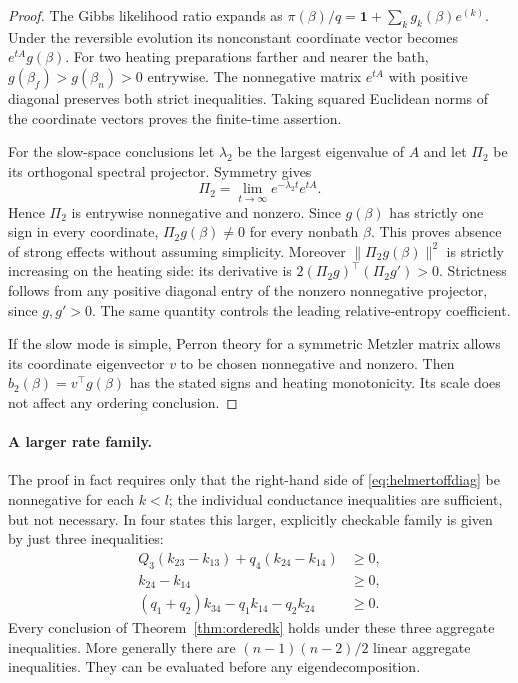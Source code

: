 \begin{proof}
The Gibbs likelihood ratio expands as
$\pi(\beta)/q=\mathbf1+\sum_k g_k(\beta)e^{(k)}$.
Under the reversible evolution its nonconstant coordinate vector becomes
$e^{tA}g(\beta)$. For two heating preparations farther and nearer the bath,
$g(\beta_f)>g(\beta_n)>0$ entrywise. The nonnegative matrix $e^{tA}$ with
positive diagonal preserves both strict inequalities. Taking squared
Euclidean norms of the coordinate vectors proves the finite-time assertion.

For the slow-space conclusions let $\lambda_2$ be the largest eigenvalue
of $A$ and let $\Pi_2$ be its orthogonal spectral projector. Symmetry gives
\[
\Pi_2=\lim_{t\to\infty}e^{-\lambda_2t}e^{tA}.
\]
Hence $\Pi_2$ is entrywise nonnegative and nonzero. Since $g(\beta)$ has
strictly one sign in every coordinate, $\Pi_2g(\beta)\ne0$ for every
nonbath $\beta$. This proves absence of strong effects without assuming
simplicity. Moreover $\|\Pi_2g(\beta)\|^2$ is strictly increasing on the
heating side: its derivative is
$2(\Pi_2g)^\top(\Pi_2g')>0$. Strictness follows from any positive diagonal
entry of the nonzero nonnegative projector, since $g,g'>0$. The same
quantity controls the leading relative-entropy coefficient.

If the slow mode is simple, Perron theory for a symmetric Metzler matrix
allows its coordinate eigenvector $v$ to be chosen nonnegative and nonzero.
Then $b_2(\beta)=v^\top g(\beta)$ has the stated signs and heating
monotonicity. Its scale does not affect any ordering conclusion.
\end{proof}

\paragraph{A larger rate family.}
The proof in fact requires only that the right-hand side of
\eqref{eq:helmertoffdiag} be nonnegative for each $k<l$; the individual
conductance inequalities are sufficient, but not necessary. In four states
this larger, explicitly checkable family is given by just three inequalities:
\begin{align*}
Q_3(k_{23}-k_{13})+q_4(k_{24}-k_{14})&\geq0,\\
k_{24}-k_{14}&\geq0,\\
(q_1+q_2)k_{34}-q_1k_{14}-q_2k_{24}&\geq0.
\end{align*}
Every conclusion of Theorem~\ref{thm:orderedk} holds under these three
aggregate inequalities. More generally there are $(n-1)(n-2)/2$ linear
aggregate inequalities. They can be evaluated before any eigendecomposition.

